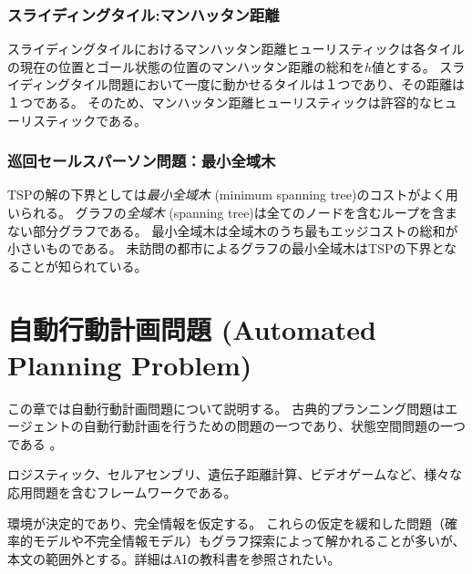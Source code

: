 \documentclass[b5paper]{report}
\begin{document}
\subsection{スライディングタイル:マンハッタン距離}
スライディングタイルにおけるマンハッタン距離ヒューリスティックは各タイルの現在の位置とゴール状態の位置のマンハッタン距離の総和を$h$値とする。
スライディングタイル問題において一度に動かせるタイルは１つであり、その距離は１つである。
そのため、マンハッタン距離ヒューリスティックは許容的なヒューリスティックである。



\subsection{巡回セールスパーソン問題：最小全域木}
TSPの解の下界としては{\it 最小全域木} (minimum spanning tree)のコストがよく用いられる。
グラフの{\it 全域木} (spanning tree)は全てのノードを含むループを含まない部分グラフである。
最小全域木は全域木のうち最もエッジコストの総和が小さいものである。
未訪問の都市によるグラフの最小全域木はTSPの下界となることが知られている。




\chapter{自動行動計画問題 (Automated Planning Problem)}
\label{ch:classical-planning}
この章では自動行動計画問題について説明する。
古典的プランニング問題はエージェントの自動行動計画を行うための問題の一つであり、状態空間問題の一つである \cite{fikes:71}。

ロジスティック\cite{helmert2010scanalyzer,sousa2013toward}、セルアセンブリ\cite{asai2014fully}、遺伝子距離計算\cite{erdem2005genome}、ビデオゲーム\cite{lipovetzky2015a}など、様々な応用問題を含むフレームワークである。

環境が決定的であり、完全情報を仮定する。
これらの仮定を緩和した問題（確率的モデルや不完全情報モデル）もグラフ探索によって解かれることが多いが、本文の範囲外とする。詳細はAIの教科書を参照されたい\cite{russelln03}。
\end{document}
